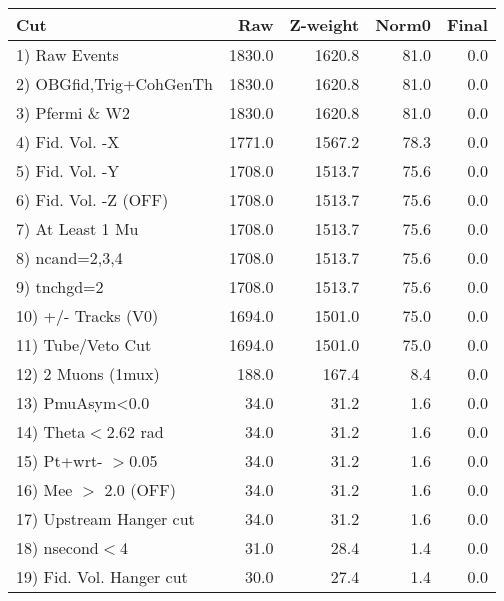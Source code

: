  \begin{table}[h!]\centering
 \begin{tabular}{||l||r|r|r|r||}
 \hline
 \hline
 Cut & Raw & Z-weight & Norm0 & Final \\
 \hline
  1) Raw Events           &      1830.0 &      1620.8 &        81.0 &         0.0 \\
  2) OBGfid,Trig+CohGenTh &      1830.0 &      1620.8 &        81.0 &         0.0 \\
  3) Pfermi \& W2         &      1830.0 &      1620.8 &        81.0 &         0.0 \\
  4) Fid. Vol. -X         &      1771.0 &      1567.2 &        78.3 &         0.0 \\
  5) Fid. Vol. -Y         &      1708.0 &      1513.7 &        75.6 &         0.0 \\
  6) Fid. Vol. -Z (OFF)   &      1708.0 &      1513.7 &        75.6 &         0.0 \\
  7) At Least 1 Mu        &      1708.0 &      1513.7 &        75.6 &         0.0 \\
  8) ncand=2,3,4          &      1708.0 &      1513.7 &        75.6 &         0.0 \\
  9) tnchgd=2             &      1708.0 &      1513.7 &        75.6 &         0.0 \\
 10) +/- Tracks (V0)      &      1694.0 &      1501.0 &        75.0 &         0.0 \\
 11) Tube/Veto Cut        &      1694.0 &      1501.0 &        75.0 &         0.0 \\
 12) 2 Muons (1mux)       &       188.0 &       167.4 &         8.4 &         0.0 \\
 13) PmuAsym<0.0          &        34.0 &        31.2 &         1.6 &         0.0 \\
 14) Theta$<$2.62 rad     &        34.0 &        31.2 &         1.6 &         0.0 \\
 15) Pt+wrt- $>$0.05      &        34.0 &        31.2 &         1.6 &         0.0 \\
 16) Mee $>$ 2.0  (OFF)   &        34.0 &        31.2 &         1.6 &         0.0 \\
 17) Upstream Hanger cut  &        34.0 &        31.2 &         1.6 &         0.0 \\
 18) nsecond$<$4          &        31.0 &        28.4 &         1.4 &         0.0 \\
 19) Fid. Vol. Hanger cut &        30.0 &        27.4 &         1.4 &         0.0 \\

\end{tabular}
\end{table}
